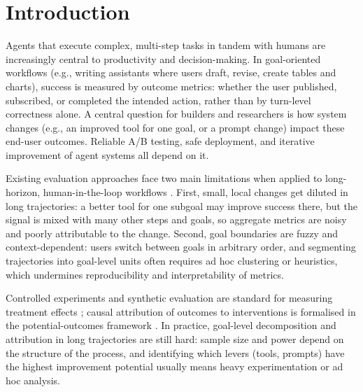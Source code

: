 \section{Introduction}
\label{sec:introduction}

Agents that execute complex, multi-step tasks in tandem with humans are increasingly central to productivity and decision-making. In goal-oriented workflows (e.g., writing assistants where users draft, revise, create tables and charts), success is measured by outcome metrics: whether the user published, subscribed, or completed the intended action, rather than by turn-level correctness alone. A central question for builders and researchers is how system changes (e.g., an improved tool for one goal, or a prompt change) impact these end-user outcomes. Reliable A/B testing, safe deployment, and iterative improvement of agent systems all depend on it.

Existing evaluation approaches face two main limitations when applied to long-horizon, human-in-the-loop workflows \citep{kohavi2020trustworthy, takanobu2020goal, imbens2015causal}. First, small, local changes get diluted in long trajectories: a better tool for one subgoal may improve success there, but the signal is mixed with many other steps and goals, so aggregate metrics are noisy and poorly attributable to the change. Second, goal boundaries are fuzzy and context-dependent: users switch between goals in arbitrary order, and segmenting trajectories into goal-level units often requires ad hoc clustering or heuristics, which undermines reproducibility and interpretability of metrics.

Controlled experiments and synthetic evaluation are standard for measuring treatment effects \citep{kohavi2020trustworthy, rubin2005causal}; causal attribution of outcomes to interventions is formalised in the potential-outcomes framework \citep{imbens2015causal}. In practice, goal-level decomposition and attribution in long trajectories are still hard: sample size and power depend on the structure of the process, and identifying which levers (tools, prompts) have the highest improvement potential usually means heavy experimentation or ad hoc analysis.

